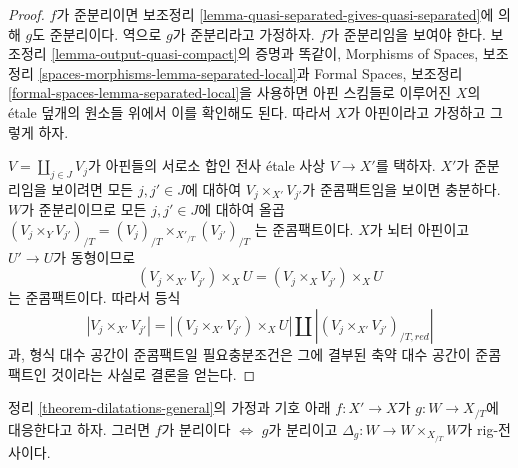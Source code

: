 \begin{proof}
$f$가 준분리이면 보조정리
\ref{lemma-quasi-separated-gives-quasi-separated}에 의해
$g$도 준분리이다. 역으로 $g$가 준분리라고 가정하자.
$f$가 준분리임을 보여야 한다.
보조정리 \ref{lemma-output-quasi-compact}의 증명과 똑같이,
Morphisms of Spaces, 보조정리
\ref{spaces-morphisms-lemma-separated-local}과
Formal Spaces, 보조정리
\ref{formal-spaces-lemma-separated-local}을 사용하면
아핀 스킴들로 이루어진 $X$의 \'etale 덮개의 원소들 위에서
이를 확인해도 된다. 따라서 $X$가 아핀이라고 가정하고 그렇게 하자.

\medskip\noindent
$V = \coprod_{j \in J} V_j$가 아핀들의 서로소 합인
전사 \'etale 사상 $V \to X'$를 택하자.
$X'$가 준분리임을 보이려면 모든 $j, j' \in J$에 대하여
$V_j \times_{X'} V_{j'}$가 준콤팩트임을 보이면 충분하다.
$W$가 준분리이므로 모든 $j, j' \in J$에 대하여 올곱
$(V_j \times_Y V_{j'})_{/T} =
(V_j)_{/T} \times_{X'_{/T}} (V_{j'})_{/T}$
는 준콤팩트이다. $X$가 뇌터 아핀이고
$U' \to U$가 동형이므로
$$
(V_j \times_{X'} V_{j'}) \times_X U =
(V_j \times_X V_{j'}) \times_X U
$$
는 준콤팩트이다. 따라서 등식
$$
|V_j \times_{X'} V_{j'}| =
|(V_j \times_{X'} V_{j'}) \times_X U| \amalg
|(V_j \times_{X'} V_{j'})_{/T, red}|
$$
과, 형식 대수 공간이 준콤팩트일 필요충분조건은
그에 결부된 축약 대수 공간이 준콤팩트인 것이라는 사실로 결론을 얻는다.
\end{proof}

\begin{lemma}
\label{lemma-output-separated}
정리 \ref{theorem-dilatations-general}의 가정과 기호 아래
$f : X' \to X$가 $g : W \to X_{/T}$에 대응한다고 하자.
그러면 $f$가 분리이다 $\Leftrightarrow$
$g$가 분리이고 $\Delta_g : W \to W \times_{X_{/T}} W$가
rig-전사이다.
\end{lemma}

